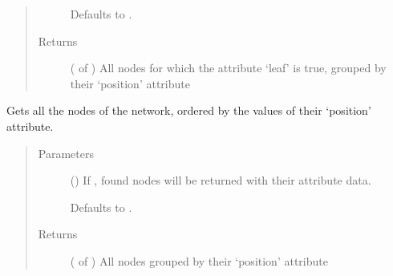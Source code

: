 \documentclass[letterpaper,10pt,english]{sphinxmanual}
\begin{document}
\begin{fulllineitems}
\begin{fulllineitems}
\begin{quote}
\begin{description}
Defaults to .


\item[{Returns}] \leavevmode
{} ( of ) \textendash{} All nodes for which the attribute ‘leaf’ is true, grouped by their
‘position’ attribute

\end{description}\end{quote}

\end{fulllineitems}


\begin{fulllineitems}
\label{\detokenize{cockatoo:cockatoo.KnitNetworkBase.all_nodes_by_position}}
Gets all the nodes of the network, ordered by the values of their
‘position’ attribute.
\begin{quote}\begin{description}
\item[{Parameters}] \leavevmode
{} (\sphinxstyleliteralemphasis{\sphinxupquote{, }}) \textendash{} 
If , found nodes will be returned with their attribute
data.

Defaults to .


\item[{Returns}] \leavevmode
{} ( of ) \textendash{} All nodes grouped by their ‘position’ attribute

\end{description}\end{quote}

\end{fulllineitems}



\end{fulllineitems}
\end{document}
